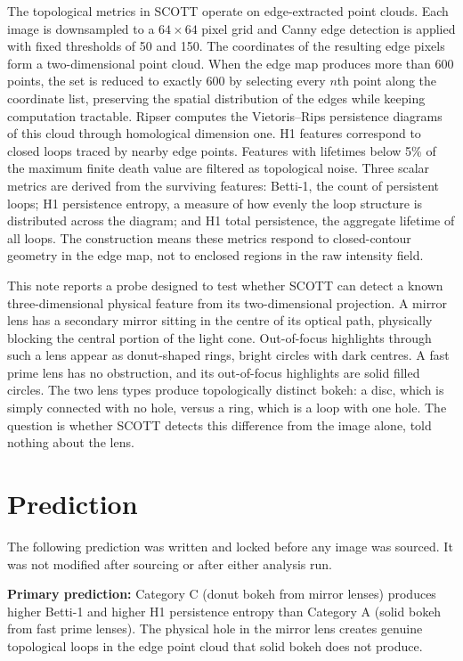 \documentclass[11pt,a4paper]{article}
\begin{document}
The topological metrics in SCOTT operate on edge-extracted point clouds. Each image is downsampled to a $64 \times 64$ pixel grid and Canny edge detection is applied with fixed thresholds of 50 and 150. The coordinates of the resulting edge pixels form a two-dimensional point cloud. When the edge map produces more than 600 points, the set is reduced to exactly 600 by selecting every $n$th point along the coordinate list, preserving the spatial distribution of the edges while keeping computation tractable. Ripser \cite{tralie2018} computes the Vietoris--Rips persistence diagrams of this cloud through homological dimension one. H1 features correspond to closed loops traced by nearby edge points. Features with lifetimes below 5\% of the maximum finite death value are filtered as topological noise. Three scalar metrics are derived from the surviving features: Betti-1, the count of persistent loops; H1 persistence entropy, a measure of how evenly the loop structure is distributed across the diagram; and H1 total persistence, the aggregate lifetime of all loops. The construction means these metrics respond to closed-contour geometry in the edge map, not to enclosed regions in the raw intensity field.

This note reports a probe designed to test whether SCOTT can detect a known three-dimensional physical feature from its two-dimensional projection. A mirror lens has a secondary mirror sitting in the centre of its optical path, physically blocking the central portion of the light cone. Out-of-focus highlights through such a lens appear as donut-shaped rings, bright circles with dark centres. A fast prime lens has no obstruction, and its out-of-focus highlights are solid filled circles. The two lens types produce topologically distinct bokeh: a disc, which is simply connected with no hole, versus a ring, which is a loop with one hole. The question is whether SCOTT detects this difference from the image alone, told nothing about the lens.

\section{Prediction}

The following prediction was written and locked before any image was sourced. It was not modified after sourcing or after either analysis run.

\textbf{Primary prediction:} Category C (donut bokeh from mirror lenses) produces higher Betti-1 and higher H1 persistence entropy than Category A (solid bokeh from fast prime lenses). The physical hole in the mirror lens creates genuine topological loops in the edge point cloud that solid bokeh does not produce.
\end{document}
